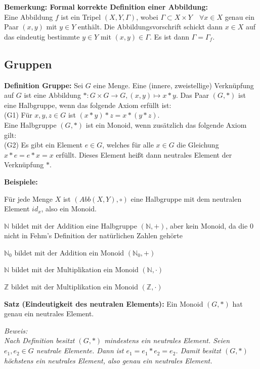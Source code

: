 \documentclass[11pt]{article}
\begin{document}
			\textbf{Bemerkung: Formal korrekte Definition einer Abbildung:} \\
			Eine Abbildung $f$ ist ein Tripel $(X,Y,\Gamma)$, wobei $\Gamma \subset X \times Y \quad \forall
			x \in X$ genau ein Paar $(x,y)$ mit $y \in Y$ enth\"alt. Die Abbildungsvorschrift schickt dann
			$x \in X$ auf das eindeutig bestimmte $y \in Y$ mit $(x,y) \in \Gamma$. Es ist dann $\Gamma =
			\Gamma_f$.
			
	\subsection{Gruppen}
		\begin{mdframed}[backgroundcolor=blue!20]
			\textbf{Definition Gruppe:} Sei $G$ eine Menge. Eine (innere, zweistellige) Verkn\"upfung
			auf $G$ ist eine Abbildung $*: G \times G \to G, (x,y) \mapsto x*y$. Das Paar $(G,*)$ ist eine
			Halbgruppe, wenn das folgende Axiom erf\"ullt ist: \\
			(G1) F\"ur $x,y,z \in G$ ist $(x*y)*z=x*(y*z)$. \\
			Eine Halbgruppe $(G,*)$ ist ein Monoid, wenn zus\"atzlich das folgende Axiom gilt: \\
			(G2) Es gibt ein Element $e \in G$, welches f\"ur alle $x \in G$ die Gleichung $x*e=e*x=x$
			erf\"ullt. Dieses Element hei{\ss}t dann neutrales Element der Verkn\"upfung $*$.  
		\end{mdframed}
		
		\textbf{Beispiele:} \\
		\begin{compactitem}
			\item F\"ur jede Menge $X$ ist $(Abb(X,Y), \circ)$ eine Halbgruppe mit dem neutralen Element
			$id_x$, also ein Monoid.
			\item $\mathbb N$ bildet mit der Addition eine Halbgruppe $(\mathbb N,+)$, aber kein Monoid,
			da die 0 nicht in Fehm's Definition der nat\"urlichen Zahlen geh\"orte
			\item $\mathbb N_0$ bildet mit der Addition ein Monoid $(\mathbb N_0,+)$
			\item $\mathbb N$ bildet mit der Multiplikation ein Monoid $(\mathbb N, \cdot)$
			\item $\mathbb Z$ bildet mit der Multiplikation ein Monoid $(\mathbb Z, \cdot)$
		\end{compactitem}
		
		\begin{framed}
			\textbf{Satz (Eindeutigkeit des neutralen Elements):} Ein Monoid $(G,*)$ hat genau ein neutrales
			Element. 
		\end{framed}
		\textit{Beweis: \\
		Nach Definition besitzt $(G,*)$ mindestens ein neutrales Element. Seien $e_1,e_2\in G$ neutrale Elemente. Dann 
		ist $e_1=e_1 * e_2=e_2$. Damit besitzt $(G,*)$ höchstens ein neutrales Element, also genau ein neutrales Element.}
		
\end{document}
